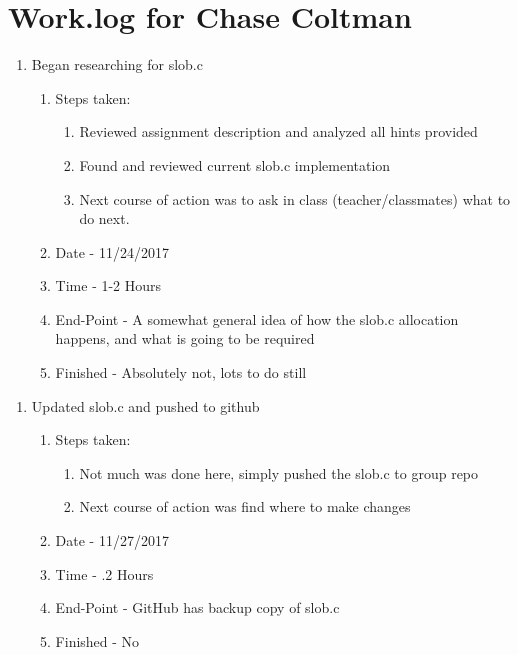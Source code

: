 \documentclass[journal,10pt,onecolumn,compsoc]{IEEEtran} \usepackage[margin=1.0in]{geometry} \usepackage{pdfpages}
\begin{document}
\section{Work.log for Chase Coltman}
	\begin {enumerate}
    	\item Began researching for slob.c
        \begin{enumerate}
            \item Steps taken:
        	\begin{enumerate}
                  \item Reviewed assignment description and analyzed all hints provided
                  \item Found and reviewed current slob.c implementation
                  \item Next course of action was to ask in class (teacher/classmates) what to do next.
     		\end{enumerate}   
            \item Date - 11/24/2017
            \item Time - 1-2 Hours
            \item End-Point - A somewhat general idea of how the slob.c allocation happens, and what is going to be required 
            \item Finished - Absolutely not, lots to do still  \\
        \end{enumerate}
	\end{enumerate}
    
 	\begin {enumerate}
    	\item Updated slob.c and pushed to github
        \begin{enumerate}
            \item Steps taken:
        	\begin{enumerate}
                  \item Not much was done here, simply pushed the slob.c to group repo
                  \item Next course of action was find where to make changes
     		\end{enumerate}   
            \item Date - 11/27/2017
            \item Time - .2 Hours
            \item End-Point - GitHub has backup copy of slob.c
            \item Finished - No  \\
        \end{enumerate}
	\end{enumerate}
	
\end{document}
